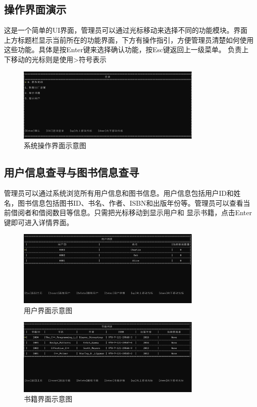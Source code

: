 \documentclass{article}
\begin{document}
\subsection{操作界面演示}

这是一个简单的UI界面，管理员可以通过光标移动来选择不同的功能模块。界面上方标题栏显示当前所在的功能界面，下方有操作指引，方便管理员清楚如何使用这些功能。具体是按Enter键来选择确认功能，按Esc键返回上一级菜单。
负责上下移动的光标则是使用\textgreater{}符号表示

\begin{figure}[H]
    \centering
    \includegraphics[width=0.8\textwidth]{system.png}
    \caption{系统操作界面示意图}
\end{figure}

\subsection{用户信息查寻与图书信息查寻}
管理员可以通过系统浏览所有用户信息和图书信息。用户信息包括用户ID和姓名，图书信息包括图书ID、书名、作者、ISBN和出版年份等。管理员可以查看当前借阅者和借阅数目等信息。只需把光标移动到显示用户和
显示书籍，点击Enter键即可进入详情界面。

\begin{figure}[H]
    \centering
    \includegraphics[width=0.8\textwidth]{user.png}
    \caption{用户界面示意图}
\end{figure}

\begin{figure}[H]
    \centering
    \includegraphics[width=0.8\textwidth]{book.png}
    \caption{书籍界面示意图}
\end{figure}
\end{document}
